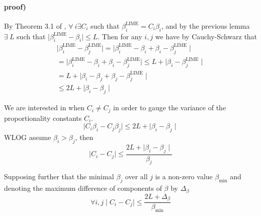     \paragraph{proof)}
        By Theorem 3.1 of \citep{garreau20theoretical}, $\forall\ i \exists C_i$ such that $\beta^{\text{LIME}}_i = C_i \beta_i$, and by the previous lemma $\exists\ L$ such that $\mid\beta^{\text{LIME}}_i - \beta_i\mid \leq L$. Then for any $i,j$ we have by Cauchy-Schwarz that
        \begin{align*}
            \mid\beta^{\text{LIME}}_i - \beta^{\text{LIME}}_j\mid = \mid\beta^{\text{LIME}}_i - \beta_i + \beta_i - \beta^{\text{LIME}}_j\mid \\
            = \mid\beta^{\text{LIME}}_i - \beta_i + \beta_i - \beta^{\text{LIME}}_j\mid \leq L + \mid\beta_i - \beta^{\text{LIME}}_j\mid \\
            = L + \mid\beta_i - \beta_j + \beta_j - \beta^{\text{LIME}}_j\mid \\
            \leq 2L + \mid\beta_i - \beta_j\mid
        \end{align*}


        We are interested in when $C_i \neq C_j$ in order to gauge the variance of the proportionality constants $C_i$.%
        \begin{equation*}
           \mid C_i \beta_i - C_j \beta_j\mid \leq  2L + \mid \beta_i - \beta_j\mid%
        \end{equation*}
        WLOG assume $\beta_i > \beta_j$, then
        \begin{equation*}
            \mid C_i - C_j \mid \leq \frac{2L + \mid \beta_i - \beta_j \mid}{\beta_j}
        \end{equation*}

        Supposing further that the minimal $\beta_j$ over all $j$ is a non-zero value $\beta_{\text{min}}$ and  denoting the maximum difference of components of $\beta$ by $\Delta_\beta$
        \begin{equation*}
            \forall i,j \mid C_i - C_j \mid \leq \frac{2L + \Delta_{\beta}}{\beta_{\text{min}}}
        \end{equation*}

